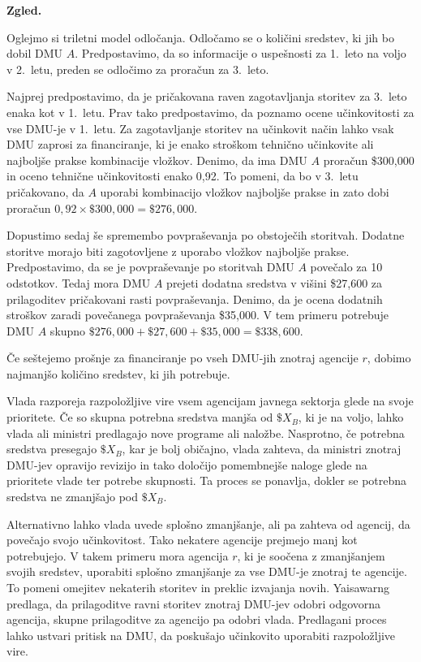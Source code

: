 \documentclass[12pt,a4paper]{article}
\theoremstyle{definition}
\newenvironment{zgled}{%
  \begin{mdframed}[linewidth=0.5pt, topline=true, bottomline=true, leftline=true, rightline=true, 
                  innertopmargin=\baselineskip, innerbottommargin=\baselineskip]%
  \textbf{Zgled.}%
}{%
  \end{mdframed}%
}
\begin{document}
\begin{zgled}
    Oglejmo si triletni model odločanja. Odločamo se o količini sredstev, ki jih bo dobil DMU $A$. Predpostavimo, da so informacije o uspešnosti za 1.\ leto na voljo v 2.\ letu, preden se odločimo za proračun za 3.\ leto.

    Najprej predpostavimo, da je pričakovana raven
    zagotavljanja storitev za 3.\ leto enaka kot v 1.\
    letu. Prav tako predpostavimo, da poznamo ocene
    učinkovitosti za vse DMU-je v 1.\ letu. Za
    zagotavljanje storitev na učinkovit način lahko vsak
    DMU zaprosi za financiranje, ki je enako stroškom tehnično
    učinkovite ali najboljše prakse kombinacije vložkov.
    Denimo, da ima DMU $A$ proračun \$300{,}000 in oceno
    tehnične učinkovitosti enako 0{,}92. To pomeni, da bo v
    3.\ letu pričakovano, da $A$ uporabi kombinacijo vložkov
    najboljše prakse in zato dobi proračun $0{,}92 \times \$300{,}000 =
    \$276{,}000$.

    Dopustimo sedaj še spremembo povpraševanja po obstoječih
    storitvah. Dodatne storitve morajo biti zagotovljene
    z uporabo vložkov najboljše prakse. Predpostavimo,
    da se je povpraševanje po storitvah DMU $A$ povečalo
    za 10 odstotkov. Tedaj mora DMU $A$ prejeti dodatna
    sredstva v višini \$27{,}600 za prilagoditev 
    pričakovani rasti povpraševanja. Denimo, da je
    ocena dodatnih stroškov zaradi povečanega
    povpraševanja \$35{,}000. V tem primeru potrebuje
    DMU $A$ skupno $\$276{,}000 + \$27{,}600 + \$35{,}000
    = \$338{,}600$.
    
    Če seštejemo prošnje za financiranje po vseh DMU-jih
    znotraj agencije $r$, dobimo najmanjšo količino sredstev,
    ki jih potrebuje. \cite{Yaisawarng2002}
\end{zgled}

Vlada razporeja razpoložljive vire vsem agencijam 
javnega sektorja glede na svoje prioritete. Če so
skupna potrebna sredstva manjša od $\$X_B$, ki je na
voljo, lahko vlada ali ministri predlagajo nove 
programe ali naložbe. Nasprotno, če potrebna sredstva
presegajo $\$X_B$, kar je bolj običajno, vlada
zahteva, da ministri znotraj DMU-jev opravijo revizijo
in tako določijo pomembnejše naloge glede na prioritete
vlade ter potrebe skupnosti. Ta proces se ponavlja,
dokler se potrebna sredstva ne zmanjšajo pod $\$X_B$.

Alternativno lahko vlada uvede splošno zmanjšanje, ali
pa zahteva od agencij, da povečajo svojo učinkovitost.
Tako nekatere agencije prejmejo manj kot potrebujejo.
V takem primeru mora agencija $r$, ki je soočena z 
zmanjšanjem svojih sredstev, uporabiti splošno
zmanjšanje za vse DMU-je znotraj te agencije. To
pomeni omejitev nekaterih storitev in preklic
izvajanja novih. \mbox{Yaisawarng} predlaga, da
prilagoditve ravni storitev znotraj DMU-jev odobri
odgovorna agencija, skupne prilagoditve za agencijo
pa odobri vlada. Predlagani proces lahko ustvari 
pritisk na DMU, da poskušajo učinkovito uporabiti 
razpoložljive vire. 
\cite{Yaisawarng2002}
\end{document}
